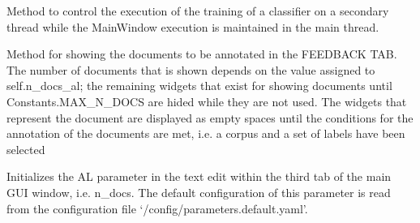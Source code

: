 \documentclass[letterpaper,10pt,english]{sphinxmanual}
\begin{document}
\begin{fulllineitems}
\begin{fulllineitems}
\label{\detokenize{gui_main_window:src.graphical_user_interface.main_window.MainWindow.execute_train_classifier}}
\sphinxAtStartPar
Method to control the execution of the training of a classifier on a
secondary thread while the MainWindow execution is maintained in the
main thread.

\end{fulllineitems}


\begin{fulllineitems}
\label{\detokenize{gui_main_window:src.graphical_user_interface.main_window.MainWindow.init_feedback_elements}}
\sphinxAtStartPar
Method for showing the documents to be annotated in the FEEDBACK TAB.
The number of documents that is shown depends on the value assigned to
self.n\_docs\_al; the remaining widgets that exist for showing documents
until Constants.MAX\_N\_DOCS are hided while they are not used.
The widgets that represent the document are displayed as empty spaces
until the conditions for the annotation of the documents are met, i.e.
a corpus and a set of labels have been selected

\end{fulllineitems}


\begin{fulllineitems}
\label{\detokenize{gui_main_window:src.graphical_user_interface.main_window.MainWindow.init_ndocs_al}}
\sphinxAtStartPar
Initializes the AL parameter in the text edit within the third tab of the main GUI
window, i.e. n\_docs. The default configuration of this parameter is read from the
configuration file ‘/config/parameters.default.yaml’.

\end{fulllineitems}



\end{fulllineitems}
\end{document}
